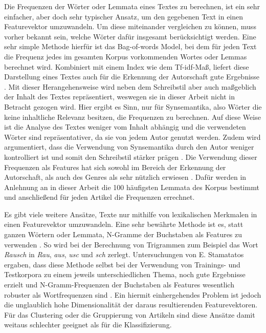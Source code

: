 Die Frequenzen der Wörter oder Lemmata eines Textes zu berechnen, ist ein sehr einfacher, aber doch sehr typischer Ansatz, um den gegebenen Text in einen Featurevektor umzuwandeln. Um diese miteinander vergleichen zu können, muss vorher bekannt sein, welche Wörter dafür insgesamt berücksichtigt werden. Eine sehr simple Methode hierfür ist das Bag-of-words Model, bei dem für jeden Text die Frequenz jedes im gesamten Korpus vorkommenden Wortes oder Lemmas berechnet wird. Kombiniert mit einem Index wie dem Tf-idf-Maß, liefert diese Darstellung eines Textes auch für die Erkennung der Autorschaft gute Ergebnisse \cite[S.~12]{sebastiani2002machine}. Mit dieser Herangehensweise wird neben dem Schreibstil aber auch maßgeblich der Inhalt des Textes repräsentiert, weswegen sie in dieser Arbeit nicht in Betracht gezogen wird. Hier ergibt es Sinn, nur für Synsemantika, also Wörter die keine inhaltliche Relevanz besitzen, die Frequenzen zu berechnen. Auf diese Weise ist die Analyse des Textes weniger vom Inhalt abhängig und die verwendeten Wörter sind repräsentativer, da sie von jedem Autor genutzt werden. Zudem wird argumentiert, dass die Verwendung von Synsemantika durch den Autor weniger kontrolliert ist und somit den Schreibstil stärker prägen \cite[S.~60-61]{kestemont2014function}. Die Verwendung dieser Frequenzen als Features hat sich sowohl im Bereich der Erkennung der Autorschaft, als auch des Genres als sehr nützlich erwiesen \cite{cimino2017identifying,stamatatos2009survey,zheng2006framework,argamon2005measuring}. Dafür werden in Anlehnung an \cite{cimino2017identifying} in dieser Arbeit die 100 häufigsten Lemmata des Korpus bestimmt und anschließend für jeden Artikel die Frequenzen errechnet.

Es gibt viele weitere Ansätze, Texte nur mithilfe von lexikalischen Merkmalen in einen Featurevektor umzuwandeln. Eine sehr bewährte Methode ist es, statt ganzen Wörtern oder Lemmata, N-Gramme der Buchstaben als Features zu verwenden \cite[S.~542]{stamatatos2009survey}. So wird bei der Berechnung von Trigrammen zum Beispiel das Wort \textit{Rausch} in \textit{Rau}, \textit{aus}, \textit{usc} und \textit{sch} zerlegt. Untersuchungen von E. Stamatatos ergaben, dass diese Methode selbst bei der Verwendung von Trainings- und Testkorpora zu einem jeweils unterschiedlichen Thema, noch gute Ergebnisse erzielt und N-Gramm-Frequenzen der Buchstaben als Features wesentlich robuster als Wortfrequenzen sind \cite{stamatatos2013robustness}. Ein hiermit einhergehendes Problem ist jedoch die unglaublich hohe Dimensionalität der daraus resultierenden Featurevektoren. Für das Clustering oder die Gruppierung von Artikeln sind diese Ansätze damit weitaus schlechter geeignet als für die Klassifizierung.

